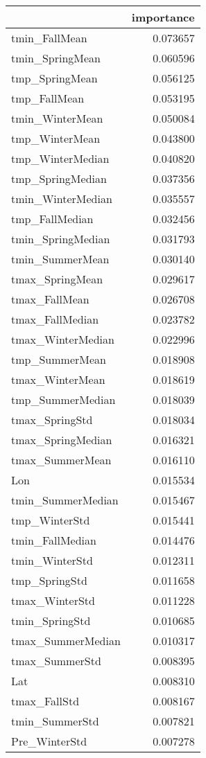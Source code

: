 \begin{tabular}{lr}
\toprule
 & importance \\
\midrule
tmin_FallMean & 0.073657 \\
tmin_SpringMean & 0.060596 \\
tmp_SpringMean & 0.056125 \\
tmp_FallMean & 0.053195 \\
tmin_WinterMean & 0.050084 \\
tmp_WinterMean & 0.043800 \\
tmp_WinterMedian & 0.040820 \\
tmp_SpringMedian & 0.037356 \\
tmin_WinterMedian & 0.035557 \\
tmp_FallMedian & 0.032456 \\
tmin_SpringMedian & 0.031793 \\
tmin_SummerMean & 0.030140 \\
tmax_SpringMean & 0.029617 \\
tmax_FallMean & 0.026708 \\
tmax_FallMedian & 0.023782 \\
tmax_WinterMedian & 0.022996 \\
tmp_SummerMean & 0.018908 \\
tmax_WinterMean & 0.018619 \\
tmp_SummerMedian & 0.018039 \\
tmax_SpringStd & 0.018034 \\
tmax_SpringMedian & 0.016321 \\
tmax_SummerMean & 0.016110 \\
Lon & 0.015534 \\
tmin_SummerMedian & 0.015467 \\
tmp_WinterStd & 0.015441 \\
tmin_FallMedian & 0.014476 \\
tmin_WinterStd & 0.012311 \\
tmp_SpringStd & 0.011658 \\
tmax_WinterStd & 0.011228 \\
tmin_SpringStd & 0.010685 \\
tmax_SummerMedian & 0.010317 \\
tmax_SummerStd & 0.008395 \\
Lat & 0.008310 \\
tmax_FallStd & 0.008167 \\
tmin_SummerStd & 0.007821 \\
Pre_WinterStd & 0.007278 \\

\end{tabular}

